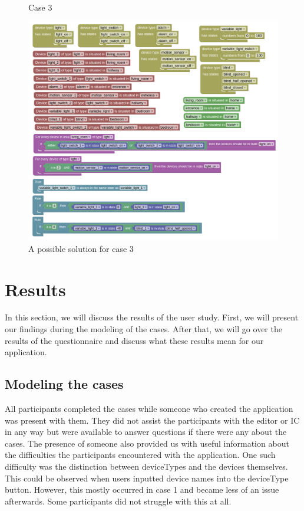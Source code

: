 \documentclass[11pt,a4paper]{report}
\begin{document}
\begin{idplisting}
\begin{figure}
    \caption{Case 3}
    \label{fig:case_3}
\end{figure}
\begin{figure}
    \centering
    \includegraphics[width=1\linewidth]{images/case_3_homy.png}
    \caption{A possible solution for case 3}
    \label{fig:case_3_solution}
\end{figure}

\section{Results}
\label{results}
In this section, we will discuss the results of the user study. First, we will present our findings during the modeling of the cases. After that, we will go over the results of the questionnaire and discuss what these results mean for our application.

\subsection{Modeling the cases}
All participants completed the cases while someone who created the application was present with them. They did not assist the participants with the editor or IC in any way but were available to answer questions if there were any about the cases. The presence of someone also provided us with useful information about the difficulties the participants encountered with the application. One such difficulty was the distinction between deviceTypes and the devices themselves. This could be observed when users inputted device names into the deviceType button. However, this mostly occurred in case 1 and became less of an issue afterwards. Some participants did not struggle with this at all.


\end{idplisting}
\end{document}
